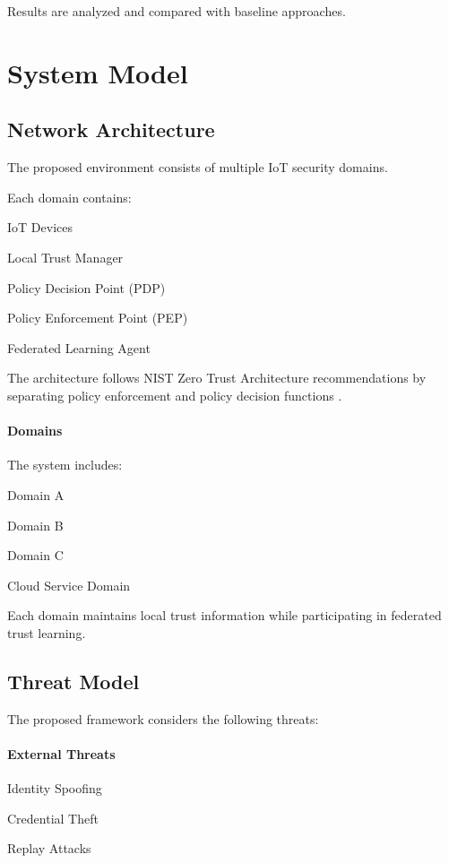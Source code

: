 Results are analyzed and compared with baseline approaches.


\section{System Model}

\subsection{Network Architecture}

The proposed environment consists of multiple IoT security domains.


Each domain contains:


IoT Devices


Local Trust Manager


Policy Decision Point (PDP)


Policy Enforcement Point (PEP)


Federated Learning Agent


The architecture follows NIST Zero Trust Architecture recommendations by separating policy enforcement and policy decision functions .


\paragraph{Domains}

The system includes:


Domain A


Domain B


Domain C


Cloud Service Domain


Each domain maintains local trust information while participating in federated trust learning.


\subsection{Threat Model}

The proposed framework considers the following threats:


\paragraph{External Threats}

Identity Spoofing


Credential Theft


Replay Attacks


